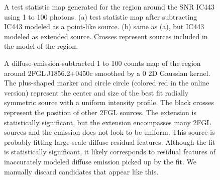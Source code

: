 \documentclass[12pt,preprint]{aastex}
\newif\ifcolorfigure
\newcommand{\gev}{\text{GeV}\xspace}
\begin{document}
\begin{figure}
  \ifcolorfigure
    \plotone{ic443_plots/res_tsmap_ic443_color.eps}
    \else
    \fi

  \caption{
  A test statistic map generated for the region around the SNR 
  IC443 using 1 \gev to 100 \gev photons.  (a) test statistic map after
  subtracting IC443 modeled as a point-like source. (b) same as (a), but
  IC443 modeled as extended source. Crosses represent sources included
  in the model of the region.}
  \label{res_tsmaps}
\end{figure}

\clearpage
\begin{figure}
    \ifcolorfigure
    \plotone{source_plots/example_bad_fit_color.eps}
    \else
    \fi
    \caption{
    A diffuse-emission-subtracted 1 \gev to 100 \gev counts map of the
    region around 2FGL\,J1856.2+0450c smoothed by a 0 2D Gaussian
    kernel. The plus-shaped marker and circle circle (colored red in
    the online version) represent the center and size of the best fit
    radially symmetric source with a uniform intensity profile.  The black
    crosses represent the position of other 2FGL sources.  The extension
    is statistically significant, but the extension encompasses many 2FGL
    sources and the emission does not look to be uniform. This source
    is probably fitting large-scale diffuse residual features. Although
    the fit is statistically significant, it likely corresponds to
    residual features of inaccurately modeled diffuse emission picked
    up by the fit.  We manually discard candidates that appear like this.
    }
    \label{example_bad_fit}
\end{figure}
\end{document}
